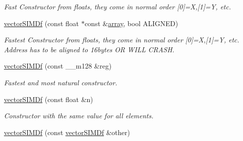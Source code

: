 \begin{DoxyCompactItemize}
\begin{DoxyCompactList}\small\item\em Fast Constructor from floats, they come in normal order \mbox{[}0\mbox{]}=X,\mbox{[}1\mbox{]}=Y, etc. \end{DoxyCompactList}\item 
\hyperlink{classirr_1_1core_1_1vectorSIMDf_a9e1a06b8bef12013ab7cf21ebb33992b}{vector\+S\+I\+M\+Df} (const float $\ast$const \&\hyperlink{classirr_1_1core_1_1array}{array}, bool A\+L\+I\+G\+N\+ED)\hypertarget{classirr_1_1core_1_1vectorSIMDf_a9e1a06b8bef12013ab7cf21ebb33992b}{}\label{classirr_1_1core_1_1vectorSIMDf_a9e1a06b8bef12013ab7cf21ebb33992b}

\begin{DoxyCompactList}\small\item\em Fastest Constructor from floats, they come in normal order \mbox{[}0\mbox{]}=X,\mbox{[}1\mbox{]}=Y, etc. Address has to be aligned to 16bytes OR W\+I\+LL C\+R\+A\+SH. \end{DoxyCompactList}\item 
\hyperlink{classirr_1_1core_1_1vectorSIMDf_a7254c478748c4a9428c82149b8b984b1}{vector\+S\+I\+M\+Df} (const \+\_\+\+\_\+m128 \&reg)\hypertarget{classirr_1_1core_1_1vectorSIMDf_a7254c478748c4a9428c82149b8b984b1}{}\label{classirr_1_1core_1_1vectorSIMDf_a7254c478748c4a9428c82149b8b984b1}

\begin{DoxyCompactList}\small\item\em Fastest and most natural constructor. \end{DoxyCompactList}\item 
\hyperlink{classirr_1_1core_1_1vectorSIMDf_a98932b293007659a7b1e35828b447f4d}{vector\+S\+I\+M\+Df} (const float \&n)\hypertarget{classirr_1_1core_1_1vectorSIMDf_a98932b293007659a7b1e35828b447f4d}{}\label{classirr_1_1core_1_1vectorSIMDf_a98932b293007659a7b1e35828b447f4d}

\begin{DoxyCompactList}\small\item\em Constructor with the same value for all elements. \end{DoxyCompactList}\item 
\hyperlink{classirr_1_1core_1_1vectorSIMDf_afdbb7dcee43e7ebe98beee6d58b83422}{vector\+S\+I\+M\+Df} (const \hyperlink{classirr_1_1core_1_1vectorSIMDf}{vector\+S\+I\+M\+Df} \&other)\hypertarget{classirr_1_1core_1_1vectorSIMDf_afdbb7dcee43e7ebe98beee6d58b83422}{}\label{classirr_1_1core_1_1vectorSIMDf_afdbb7dcee43e7ebe98beee6d58b83422}


\end{DoxyCompactItemize}

